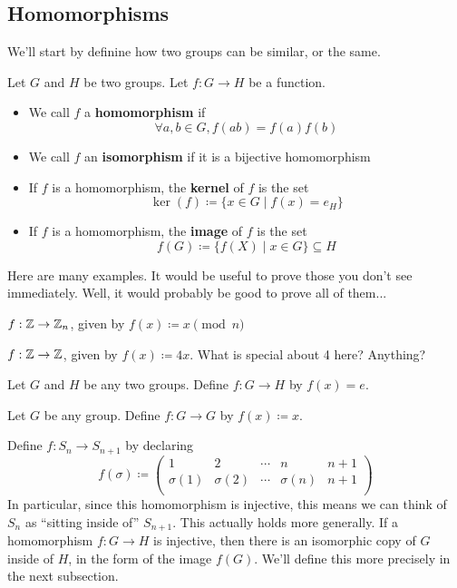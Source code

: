 \subsection{Homomorphisms}
We'll start by definine how two groups can be similar, or the same.
\begin{definition}
    Let $G$ and $H$ be two groups.
    Let $f:G\to H$ be a function.
    \begin{itemize}
        \item We call $f$ a {\bf homomorphism} if 
            \[ \forall a,b\in G, f(ab)=f(a)f(b)\]
        \item We call $f$ an {\bf isomorphism} if it is a bijective homomorphism
        \item If $f$ is a homomorphism, the {\bf kernel} of $f$ is the set
            \[ \ker(f)\coloneq \{x\in G\mid f(x)=e_H\}\]
        \item If $f$ is a homomorphism, the {\bf image} of $f$ is the set
            \[ f(G) \coloneq \{f(X) \mid x\in G\} \subseteq H\]
    \end{itemize}
\end{definition}

Here are many examples. 
It would be useful to prove those you don't see immediately.
Well, it would probably be good to prove all of them...

\begin{example}
    $f: \mathbb{Z} \to \mathbb{Z}_n$, given by $f(x) \coloneq x\pmod n$
\end{example}

\begin{example}[Multiplication]
    $f: \mathbb{Z} \to \mathbb{Z}$, given by $f(x) \coloneq 4x$.
    What is special about 4 here? Anything?
\end{example}

\begin{example}[Trivial]
    Let $G$ and $H$ be any two groups.
    Define $f: G \to H$ by $f(x) = e$.
\end{example}

\begin{example}[Identity]
    Let $G$ be any group.
    Define $f:G\to G$ by $f(x) \coloneq x$.
\end{example}

\begin{example}
    Define $f:S_n \to S_{n+1}$ by declaring 
    \[
        f(\sigma) \coloneq \begin{pmatrix}
            1 & 2 & \cdots & n & n+1 \\
            \sigma(1) & \sigma(2) & \cdots & \sigma(n) & n+1 \\
        \end{pmatrix}
    \]
    In particular, since this homomorphism is injective, this means we can think of $S_n$ as
    ``sitting inside of'' $S_{n+1}$.
    This actually holds more generally.
    If a homomorphism $f:G\to H$ is injective, then there is an isomorphic copy of $G$ inside of $H$,
    in the form of the image $f(G)$.
    We'll define this more precisely in the next subsection.
\end{example}

